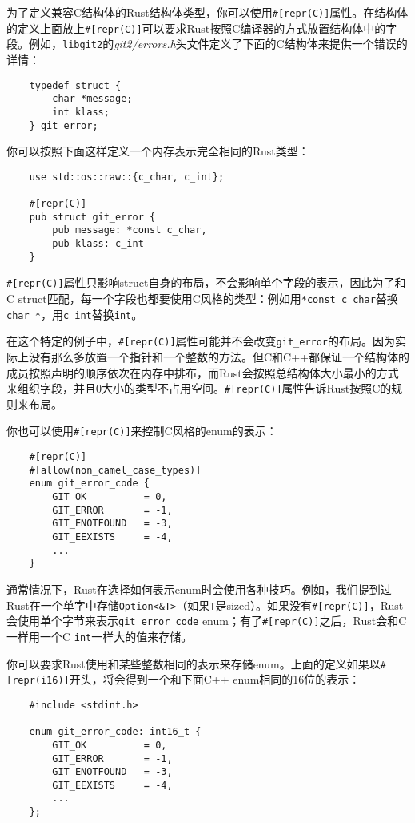 为了定义兼容C结构体的Rust结构体类型，你可以使用\texttt{\#[repr(C)]}属性。在结构体的定义上面放上\texttt{\#[repr(C)]}可以要求Rust按照C编译器的方式放置结构体中的字段。例如，\texttt{libgit2}的\emph{git2/errors.h}头文件定义了下面的C结构体来提供一个错误的详情：
\begin{verbatim}
    typedef struct {
        char *message;
        int klass;
    } git_error;
\end{verbatim}

你可以按照下面这样定义一个内存表示完全相同的Rust类型：
\begin{verbatim}
    use std::os::raw::{c_char, c_int};

    #[repr(C)]
    pub struct git_error {
        pub message: *const c_char,
        pub klass: c_int
    }
\end{verbatim}

\texttt{\#[repr(C)]}属性只影响struct自身的布局，不会影响单个字段的表示，因此为了和C struct匹配，每一个字段也都要使用C风格的类型：例如用\texttt{*const c\_char}替换\texttt{char *}，用\texttt{c\_int}替换\texttt{int}。

在这个特定的例子中，\texttt{\#[repr(C)]}属性可能并不会改变\texttt{git\_error}的布局。因为实际上没有那么多放置一个指针和一个整数的方法。但C和C++都保证一个结构体的成员按照声明的顺序依次在内存中排布，而Rust会按照总结构体大小最小的方式来组织字段，并且0大小的类型不占用空间。\texttt{\#[repr(C)]}属性告诉Rust按照C的规则来布局。

你也可以使用\texttt{\#[repr(C)]}来控制C风格的enum的表示：
\begin{verbatim}
    #[repr(C)]
    #[allow(non_camel_case_types)]
    enum git_error_code {
        GIT_OK          = 0,
        GIT_ERROR       = -1,
        GIT_ENOTFOUND   = -3,
        GIT_EEXISTS     = -4,
        ...
    }
\end{verbatim}

通常情况下，Rust在选择如何表示enum时会使用各种技巧。例如，我们提到过Rust在一个单字中存储\texttt{Option<\&T>}（如果\texttt{T}是sized）。如果没有\texttt{\#[repr(C)]}，Rust会使用单个字节来表示\texttt{git\_error\_code} enum；有了\texttt{\#[repr(C)]}之后，Rust会和C一样用一个C \texttt{int}一样大的值来存储。

你可以要求Rust使用和某些整数相同的表示来存储enum。上面的定义如果以\texttt{\#[repr(i16)]}开头，将会得到一个和下面C++ enum相同的16位的表示：
\begin{verbatim}
    #include <stdint.h>

    enum git_error_code: int16_t {
        GIT_OK          = 0,
        GIT_ERROR       = -1,
        GIT_ENOTFOUND   = -3,
        GIT_EEXISTS     = -4,
        ...
    };
\end{verbatim}


